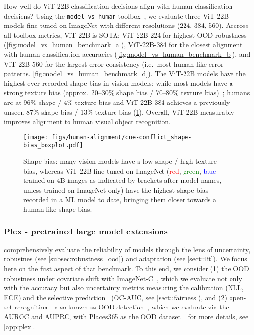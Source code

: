 \documentclass{article}
\newcommand{\chonk}{\mbox{ViT-22B}\xspace}
\begin{document}
How well do \chonk classification decisions align with human classification decisions? Using the {\tt model-vs-human} toolbox~\citep{geirhos2021partial}, we evaluate three \chonk models fine-tuned on ImageNet with different resolutions (224, 384, 560). Accross all toolbox metrics, \chonk is SOTA: \chonk-224 for highest OOD robustness (\cref{fig:model_vs_human_benchmark_a}), \chonk-384 for the closest alignment with human classification accuracies (\cref{fig:model_vs_human_benchmark_b}), and \chonk-560 for the largest error consistency (i.e.\ most human-like error patterns, \cref{fig:model_vs_human_benchmark_d}). The \chonk models have the highest ever recorded shape bias in vision models: while most models have a strong texture bias (approx.\ 20--30\% shape bias / 70--80\% texture bias)~\citep{geirhos2019imagenet}; humans are at 96\% shape / 4\% texture bias and \chonk-384 achieves a previously unseen 87\% shape bias / 13\% texture bias (\cref{fig:shape_bias}). Overall, \chonk measurably improves alignment to human visual object recognition.

\begin{figure}
    \centering
    \vspace{-5pt}
    \texttt{[image: figs/human-alignment/cue-conflict\_shape-bias\_boxplot.pdf]}
    \vspace{-0.8cm}
    \caption{Shape bias: many vision models have a low shape / high texture bias, whereas \chonk fine-tuned on ImageNet (\textcolor{red}{red}, \textcolor{green}{green}, \textcolor{blue}{blue} trained on 4B images as indicated by brackets after model names, unless trained on ImageNet only) have the highest shape bias recorded in a ML model to date, bringing them closer towards a human-like shape bias.}
    \label{fig:shape_bias}
\vspace{-10pt}
\end{figure}



\subsubsection{Plex - pretrained large model extensions}
\citet{tran2022plex} comprehensively evaluate the reliability of models through the lens of uncertainty, robustnes (see \cref{subsec:robustness_ood}) and adaptation (see \cref{sect::lit}).
We focus here on the first aspect of that benchmark. 
To this end, we consider (1) the OOD robustness under
covariate shift with ImageNet-C~\citep{hendrycks2019benchmarking}, which we evaluate not only with the accuracy but also uncertainty metrics measuring the calibration (NLL, ECE) and the selective prediction~\citep{el2010foundations} (OC-AUC, see \cref{sect::fairness}), and (2) open-set recognition---also known as OOD detection~\citep{fort2021exploring}, which we evaluate via the AUROC and AUPRC, with Places365 as the OOD dataset~\citep{hendrycks2019scaling}; for more details, see \cref{app:plex}.
\end{document}
